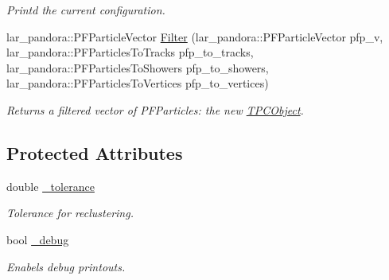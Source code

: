 \begin{DoxyCompactItemize}
\begin{DoxyCompactList}\small\item\em \-Printd the current configuration. \end{DoxyCompactList}\item 
\hypertarget{classubana_1_1TPCObjectFilter_ab485fca5770b8a9622d56c294b361ef3}{lar\-\_\-pandora\-::\-P\-F\-Particle\-Vector \hyperlink{classubana_1_1TPCObjectFilter_ab485fca5770b8a9622d56c294b361ef3}{\-Filter} (lar\-\_\-pandora\-::\-P\-F\-Particle\-Vector pfp\-\_\-v, lar\-\_\-pandora\-::\-P\-F\-Particles\-To\-Tracks pfp\-\_\-to\-\_\-tracks, lar\-\_\-pandora\-::\-P\-F\-Particles\-To\-Showers pfp\-\_\-to\-\_\-showers, lar\-\_\-pandora\-::\-P\-F\-Particles\-To\-Vertices pfp\-\_\-to\-\_\-vertices)}\label{classubana_1_1TPCObjectFilter_ab485fca5770b8a9622d56c294b361ef3}

\begin{DoxyCompactList}\small\item\em \-Returns a filtered vector of \-P\-F\-Particles\-: the new \hyperlink{classubana_1_1TPCObject}{\-T\-P\-C\-Object}. \end{DoxyCompactList}\end{DoxyCompactItemize}
\subsection*{\-Protected \-Attributes}
\begin{DoxyCompactItemize}
\item 
\hypertarget{classubana_1_1TPCObjectFilter_a86137c0a525fdd2b5a63afe4ff79c23c}{double \hyperlink{classubana_1_1TPCObjectFilter_a86137c0a525fdd2b5a63afe4ff79c23c}{\-\_\-tolerance}}\label{classubana_1_1TPCObjectFilter_a86137c0a525fdd2b5a63afe4ff79c23c}

\begin{DoxyCompactList}\small\item\em \-Tolerance for reclustering. \end{DoxyCompactList}\item 
\hypertarget{classubana_1_1TPCObjectFilter_a44156494ed6ccc98d9016c2c4306f282}{bool \hyperlink{classubana_1_1TPCObjectFilter_a44156494ed6ccc98d9016c2c4306f282}{\-\_\-debug}}\label{classubana_1_1TPCObjectFilter_a44156494ed6ccc98d9016c2c4306f282}

\begin{DoxyCompactList}\small\item\em \-Enabels debug printouts. \end{DoxyCompactList}\end{DoxyCompactItemize}


